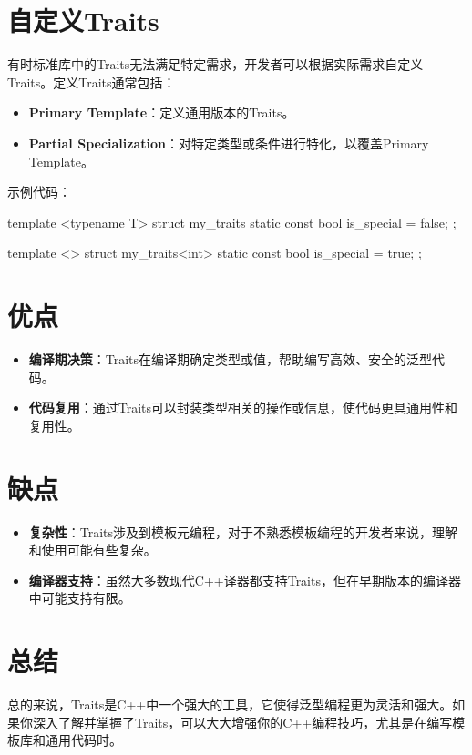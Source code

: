 \section{自定义Traits}
有时标准库中的Traits无法满足特定需求，开发者可以根据实际需求自定义Traits。定义Traits通常包括：
\begin{itemize}
	\item \textbf{Primary Template}：定义通用版本的Traits。
	\item \textbf{Partial Specialization}：对特定类型或条件进行特化，以覆盖Primary Template。
\end{itemize}

示例代码：

\begin{cpplst}
template <typename T>
struct my_traits {
    static const bool is_special = false;
};

template <>
struct my_traits<int> {
    static const bool is_special = true;
};
\end{cpplst}

\section{优点}
\begin{itemize}
	\item \textbf{编译期决策}：Traits在编译期确定类型或值，帮助编写高效、安全的泛型代码。
	\item \textbf{代码复用}：通过Traits可以封装类型相关的操作或信息，使代码更具通用性和复用性。
\end{itemize}

\section{缺点}
\begin{itemize}
	\item \textbf{复杂性}：Traits涉及到模板元编程，对于不熟悉模板编程的开发者来说，理解和使用可能有些复杂。
	\item \textbf{编译器支持}：虽然大多数现代C++译器都支持Traits，但在早期版本的编译器中可能支持有限。
\end{itemize}

\section{总结}
总的来说，Traits是C++中一个强大的工具，它使得泛型编程更为灵活和强大。如果你深入了解并掌握了Traits，可以大大增强你的C++编程技巧，尤其是在编写模板库和通用代码时。
